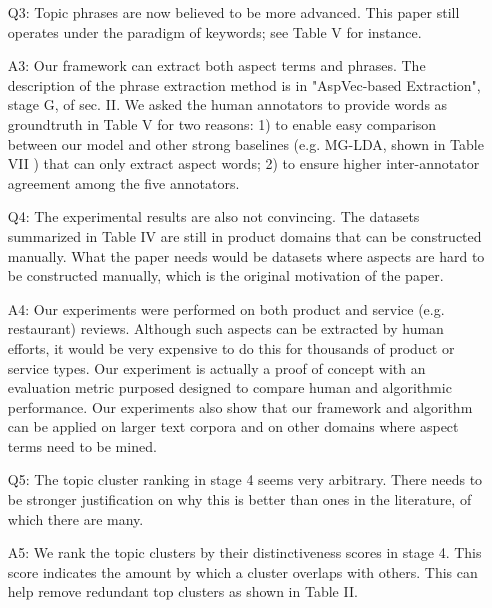 \begin{itemize}
\item [Q3:] 
Topic phrases are now believed to be more advanced. This paper still operates under the paradigm of keywords; see Table V for instance.
\item [A3:] Our framework can extract both aspect terms and phrases. 
The description of the phrase extraction method is in "AspVec-based Extraction", stage G, of sec. II. 
We asked the human annotators to provide words as groundtruth in Table V for
two reasons: 1) to enable easy comparison between our model and other 
strong baselines (e.g. MG-LDA, shown in Table VII ) that can only extract 
aspect words; 
	2) to ensure higher inter-annotator agreement among the five annotators. 
\item [Q4:] 
The experimental results are also not convincing. The datasets summarized in Table IV are still in product domains that can be constructed manually. What the paper needs would be datasets where aspects are hard to be constructed manually, which is the original motivation of the paper.
	\item [A4:]
Our experiments were performed on both product and service 
(e.g. restaurant) reviews. Although such aspects can be extracted by 
human efforts, it would be very expensive to do this for thousands of 
product or service types. 
Our experiment is actually a proof of concept with 
an evaluation metric purposed designed to compare human and algorithmic
performance. Our experiments also show that our framework and algorithm 
can be applied on larger text corpora and on other 
domains where aspect terms need to be mined.
	
\item [Q5:] 
The topic cluster ranking in stage 4 seems very arbitrary. There 
needs to be stronger justification on why this is better than ones 
in the literature, of which there are many.
\item [A5:] 
We rank the topic clusters by their distinctiveness scores in stage 4. 
This score indicates the amount by which a cluster overlaps 
with others. This can help remove redundant top clusters as shown in Table II. 
\end{itemize}

